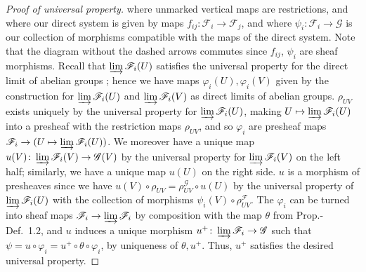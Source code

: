 \documentclass[10pt]{article}
\theoremstyle{definition}
\theoremstyle{remark}
\numberwithin{equation}{section}
\numberwithin{figure}{subsubsection}
\begin{document}
\begin{proof}[Proof of universal property]
  where unmarked vertical maps are restrictions, and where our direct system is given by maps $f_{ij}\colon\mathscr{F}_i \to \mathscr{F}_j$, and where $\psi_i \colon \mathscr{F}_i \to \mathscr{G}$ is our collection of morphisms compatible with the maps of the direct system. Note that the diagram without the dashed arrows commutes since $f_{ij}$, $\psi_i$ are sheaf morphisms. Recall that $\varinjlim\mathscr{F}_i(U)$ satisfies the universal property for the direct limit of abelian groups \cite[III, Thm.~10.1]{Lan02}; hence we have maps $\varphi_i(U),\varphi_i(V)$ given by the construction for $\varinjlim\mathscr{F}_i(U)$ and $\varinjlim\mathscr{F}_i(V)$ as direct limits of abelian groups. $\rho_{UV}$ exists uniquely by the universal property for $\varinjlim\mathscr{F}_i(U)$, making $U \mapsto \varinjlim \mathscr{F}_i(U)$ into a presheaf with the restriction maps $\rho_{UV}$, and so $\varphi_i$ are presheaf maps $\mathscr{F}_i \to (U \mapsto \varinjlim\mathscr{F}_i(U))$. We moreover have a unique map $u(V)\colon\varinjlim\mathscr{F}_i(V) \to \mathscr{G}(V)$ by the universal property for $\varinjlim\mathscr{F}_i(V)$ on the left half; similarly, we have a unique map $u(U)$ on the right side. $u$ is a morphism of presheaves since we have $u(V) \circ \rho_{UV} = \rho_{UV}^\mathscr{G} \circ u(U)$ by the universal property of $\varinjlim \mathscr{F}_i(U)$ with the collection of morphisms $\psi_i(V) \circ \rho_{UV}^\mathscr{F}$. The $\varphi_i$ can be turned into sheaf maps $\mathscr{F}_i \to \varinjlim\mathscr{F}_i$ by composition with the map $\theta$ from Prop.-Def.~1.2, and $u$ induces a unique morphism $u^+\colon\varinjlim \mathscr{F}_i \to \mathscr{G}$ such that $\psi = u \circ \varphi_i = u^+ \circ \theta \circ \varphi_i$, by uniqueness of $\theta,u^+$. Thus, $u^+$ satisfies the desired universal property.
\end{proof}
\end{document}
